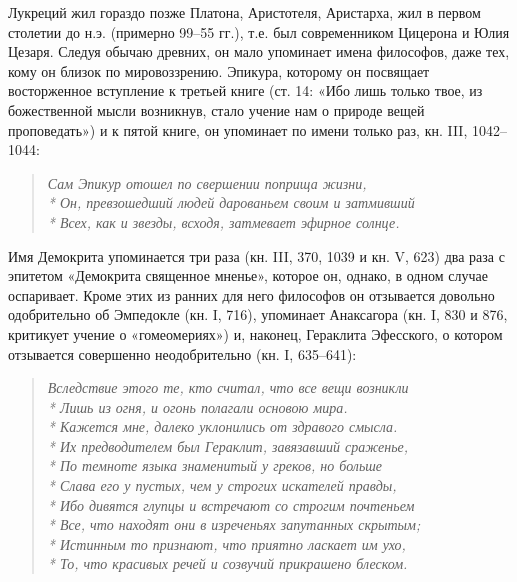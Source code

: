 Лукреций  жил  гораздо позже  Платона,  Аристотеля,  Аристарха, жил  в
первом столетии до н.э. (примерно  99--55 гг.), т.е. был современником
Цицерона и Юлия Цезаря. Следуя обычаю древних, он мало упоминает имена
философов,  даже  тех,  кому  он  близок  по  мировоззрению.  Эпикура,
которому он посвящает восторженное вступление к третьей книге (ст. 14:
«Ибо лишь только  твое, из божественной мысли  возникнув, стало учение
нам о  природе вещей проповедать»)  и к  пятой книге, он  упоминает по
имени только раз, кн. III, 1042--1044:

\begin{verse}

\emph{Сам   Эпикур  отошел   по   свершении   поприща  жизни,\\*   Он,
превзошедший людей дарованьем своим и затмивший\\* Всех, как и звезды,
всходя, затмевает эфирное солнце.}

\end{verse}

Имя Демокрита упоминается  три раза (кн. III, 370, 1039  и кн. V, 623)
два раза с эпитетом «Демокрита  священное мненье», которое он, однако,
в одном случае оспаривает. Кроме этих  из ранних для него философов он
отзывается довольно одобрительно об  Эмпедокле (кн. I, 716), упоминает
Анаксагора  (кн.  I, 830  и  876,  критикует учение  о  «гомеомериях»)
и,  наконец,  Гераклита  Эфесского, о  котором  отзывается  совершенно
неодобрительно (кн. I, 635--641):

\begin{verse}

\emph{Вследствие этого те,  кто считал, что все  вещи возникли\\* Лишь
из  огня,  и  огонь  полагали основою  мира.\\*  Кажется  мне,  далеко
уклонились  от  здравого  смысла.\\* Их  предводителем  был  Гераклит,
завязавший  сраженье,\\*  По темноте  языка  знаменитый  у греков,  но
больше\\*  Слава его  у  пустых, чем  у  строгих искателей  правды,\\*
Ибо  дивятся  глупцы и  встречают  со  строгим почтеньем\\*  Все,  что
находят они в изреченьях  запутанных скрытым;\\* Истинным то признают,
что  приятно ласкает  им ухо,\\*  То,  что красивых  речей и  созвучий
прикрашено блеском.}

\end{verse}

